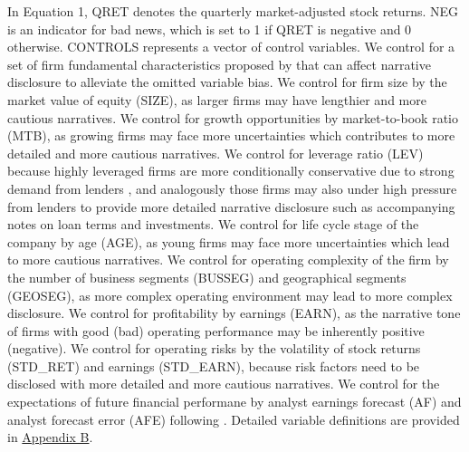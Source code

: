 \documentclass[letterpaper,11pt]{article}
\begin{document}
\begin{spacing}{1.5}
In Equation 1, QRET denotes the quarterly market-adjusted stock returns. NEG is an indicator for bad news, which is set to 1 if QRET is negative and 0 otherwise. CONTROLS represents a vector of control variables. We control for a set of firm fundamental characteristics proposed by  that can affect narrative disclosure to alleviate the omitted variable bias. We control for firm size by the market value of equity (SIZE), as larger firms may have lengthier and more cautious narratives. We control for growth opportunities by market-to-book ratio (MTB), as growing firms may face more uncertainties which contributes to more detailed and more cautious narratives. We control for leverage ratio (LEV) because highly leveraged firms are more conditionally conservative due to strong demand from lenders \cite{wattsPositiveAccountingTheory1986, wattsConservatismAccountingPart2003}, and analogously those firms may also under high pressure from lenders to provide more detailed narrative disclosure such as accompanying notes on loan terms and investments. We control for life cycle stage of the company by age (AGE), as young firms may face more uncertainties which lead to more cautious narratives. We control for operating complexity of the firm by the number of business segments (BUSSEG) and geographical segments (GEOSEG), as more complex operating environment may lead to more complex disclosure. We control for profitability by earnings (EARN), as the narrative tone of firms with good (bad) operating performance may be inherently positive (negative). We control for operating risks by the volatility of stock returns (STD\_RET) and earnings (STD\_EARN), because risk factors need to be disclosed with more detailed and more cautious narratives. We control for the expectations of future financial performane by analyst earnings forecast (AF) and analyst forecast error (AFE) following . Detailed variable definitions are provided in \hyperref[appb]{Appendix B}.


\end{spacing}
\end{document}
